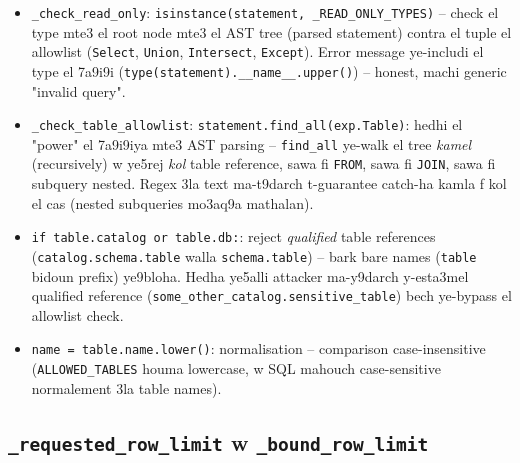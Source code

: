 \documentclass[11pt,a4paper]{report}
\DeclareRobustCommand{\code}[1]{\texttt{#1}}
\begin{document}
\begin{itemize}
  \item \code{\_check\_read\_only}: \code{isinstance(statement,
        \_READ\_ONLY\_TYPES)} -- check el type mte3 el root node mte3
        el AST tree (parsed statement) contra el tuple el allowlist
        (\code{Select}, \code{Union}, \code{Intersect}, \code{Except}).
        Error message ye-includi el type el 7a9i9i (\code{type(statement).\_\_name\_\_.upper()})
        -- honest, machi generic "invalid query".
  \item \code{\_check\_table\_allowlist}: \code{statement.find\_all(exp.Table)}:
        hedhi el "power" el 7a9i9iya mte3 AST parsing -- \code{find\_all}
        ye-walk el tree \emph{kamel} (recursively) w ye5rej \emph{kol}
        table reference, sawa fi \code{FROM}, sawa fi \code{JOIN}, sawa
        fi subquery nested. Regex 3la text ma-t9darch t-guarantee
        catch-ha kamla f kol el cas (nested subqueries mo3aq9a mathalan).
  \item \code{if table.catalog or table.db:}: reject \emph{qualified}
        table references (\code{catalog.schema.table} walla
        \code{schema.table}) -- bark bare names (\code{table} bidoun
        prefix) ye9bloha. Hedha ye5alli attacker ma-y9darch y-esta3mel
        qualified reference (\code{some\_other\_catalog.sensitive\_table})
        bech ye-bypass el allowlist check.
  \item \code{name = table.name.lower()}: normalisation -- comparison
        case-insensitive (\code{ALLOWED\_TABLES} houma lowercase, w SQL
        mahouch case-sensitive normalement 3la table names).
\end{itemize}

\subsection{\code{\_requested\_row\_limit} w \code{\_bound\_row\_limit}}
\end{document}
